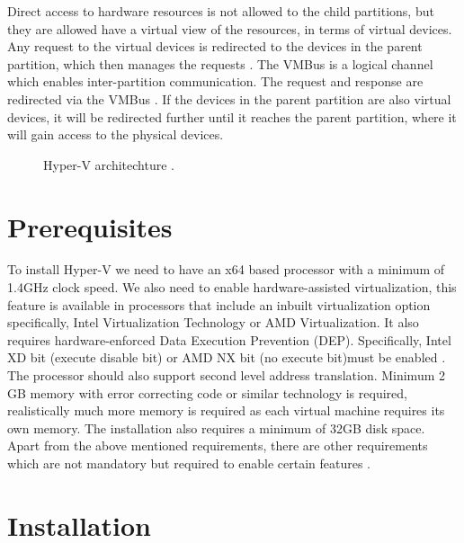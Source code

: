 \documentclass[9pt,twocolumn,twoside]{../../styles/osajnl}
\begin{document}
Direct access to hardware resources is not allowed to the child
partitions, but they are allowed have a virtual view of the resources,
in terms of virtual devices. Any request to the virtual devices is
redirected to the devices in the parent partition, which then manages
the requests \cite{www-hyperv-architecture}. The VMBus is a logical
channel which enables inter-partition communication. The request and
response are redirected via the VMBus
\cite{www-hyperv-architecture}. If the devices in the parent
partition are also virtual devices, it will be redirected further
until it reaches the parent partition, where it will gain access to
the physical devices.

\begin{figure}[htbp]
\centering
{}
\caption{Hyper-V architechture \cite{www-hyperv-wikipedia}.}
\label{fig:false-color}
\end{figure}

\section{Prerequisites}

To install Hyper-V we need to have an x64 based processor with a
minimum of 1.4GHz clock speed. We also need to enable
hardware-assisted virtualization, this feature is available in
processors that include an inbuilt virtualization option specifically,
Intel Virtualization Technology or AMD Virtualization. It also
requires hardware-enforced Data Execution Prevention
(DEP). Specifically, Intel XD bit (execute disable bit) or AMD NX bit
(no execute bit)must be enabled \cite{www-hyperv-paper2}. The
processor should also support second level address
translation. Minimum 2 GB memory with error correcting code or similar
technology is required, realistically much more memory is required as
each virtual machine requires its own memory. The installation also
requires a minimum of 32GB disk space. Apart from the above mentioned
requirements, there are other requirements which are not mandatory but
required to enable certain features \cite{www-hyperv-wikipedia}.

\section{Installation}
\end{document}
